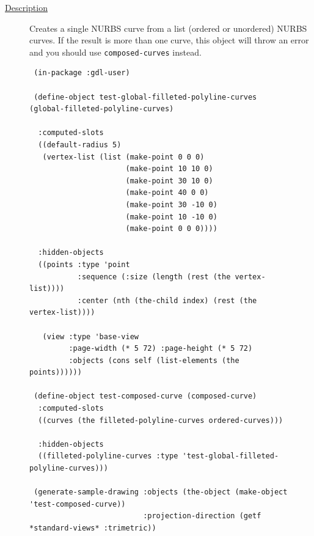 \documentclass [11pt]{book}
\begin{document}
\begin{itemize}
\begin{description}

\item [
\underline{Description}]


Creates a single NURBS curve from a list (ordered or unordered) NURBS curves. 
If the result is more than one curve, this object will throw an error and you should use \texttt{composed-curves}
instead.



\end{description}




\begin{figure}
\begin{lrbox}{\boxedverb}
\begin{minipage}{\linewidth}
{\small

\begin{verbatim}
 (in-package :gdl-user)

 (define-object test-global-filleted-polyline-curves (global-filleted-polyline-curves)
                    
  :computed-slots
  ((default-radius 5)
   (vertex-list (list (make-point 0 0 0)
                      (make-point 10 10 0)
                      (make-point 30 10 0)
                      (make-point 40 0 0)
                      (make-point 30 -10 0)
                      (make-point 10 -10 0)
                      (make-point 0 0 0))))

  :hidden-objects
  ((points :type 'point
           :sequence (:size (length (rest (the vertex-list))))
           :center (nth (the-child index) (rest (the vertex-list))))

   (view :type 'base-view
         :page-width (* 5 72) :page-height (* 5 72)
         :objects (cons self (list-elements (the points))))))

 (define-object test-composed-curve (composed-curve)
  :computed-slots
  ((curves (the filleted-polyline-curves ordered-curves)))
  
  :hidden-objects
  ((filleted-polyline-curves :type 'test-global-filleted-polyline-curves)))

 (generate-sample-drawing :objects (the-object (make-object 'test-composed-curve))
                          :projection-direction (getf *standard-views* :trimetric))


\end{verbatim}}
\end{minipage}
\end{lrbox}
\fbox{\usebox{\boxedverb}}


\end{figure}
\end{itemize}
\end{document}
